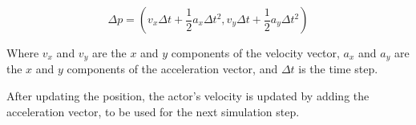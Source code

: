 \begin{equation}
    \Delta p = (v_x \Delta t + \frac{1}{2}a_x \Delta t^2, v_y \Delta t + 
    \frac{1}{2}a_y \Delta t^2)
\end{equation}

Where $v_x$ and $v_y$ are the $x$ and $y$ components of the velocity vector, 
$a_x$ and $a_y$ are the $x$ and $y$ components of the acceleration vector, and 
$\Delta t$ is the time step.

After updating the position, the actor's velocity is updated by adding the 
acceleration vector, to be used for the next simulation step.

%
%
%
%
%
%
%
